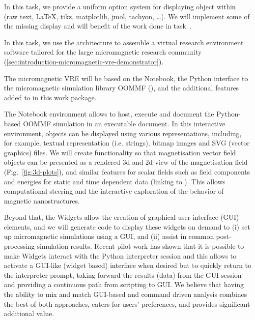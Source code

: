 \begin{workpackage}
\begin{tasklist}
\begin{task}[lead=UB,title=Common option system for various displays
  in Sage,id=Sage-display,PM=12,partners={UB},wphases=0-24]
  In this task, we provide a uniform option system for displaying object within \Sage (raw text, \LaTeX,
  tikz, matplotlib, jmol, tachyon, \ldots). We will implement some of the missing display and will benefit
  of the work done in task~.
\end{task}

\begin{task}[lead=USO,title=Case study: micromagnetic VRE built from
  \TheProject,id=oommf-py-ipython-attributes,PM=6,partners={SR,USH},wphases=9-15]

  In this task, we use the \TheProject architecture to assemble a
  virtual research environment software tailored for the large
  micromagnetic research community
  (\ref{sec:introduction-micromagnetic-vre-demonstrator}).

  The micromagnetic VRE will be based on the \Jupyter Notebook, the
  Python interface to the micromagnetic simulation library OOMMF
  (),
  and the additional features added to \Jupyter in this work
  package.

  The \Jupyter Notebook environment allows to host, execute and
  document the Python-based OOMMF simulation in an executable
  document. In this interactive environment, objects can be displayed
  using various representations, including, for example, textual
  representation (i.e. strings), bitmap images and SVG (vector
  graphics) files. We will create functionality so that magnetisation
  vector field objects can be presented as a rendered 3d and 2d-view
  of the magnetisation field (Fig.~\ref{fig:3d-plots}), and similar
  features for scalar fields such as field components and energies for
  static and time dependent data (linking to
  ). This allows computational steering and the
  interactive exploration of the behavior of magnetic nanostructures.

  Beyond that, the \Jupyter Widgets allow the creation of graphical
  user interface (GUI) elements, and we will generate code to
  display these widgets on demand to (i) set up micromagnetic
  simulations using a GUI, and (ii) assist in common post-processing
  simulation results. Recent pilot work has shown that it is possible
  to make \Jupyter Widgets interact with the Python interpreter
  session and this allows to activate a GUI-like (widget based)
  interface when desired but to quickly return to the interpreter
  prompt, taking forward the results (data) from the GUI session
  \cite{IPython-widget-GUI-demo-youtube-2014} and providing a
  continuous path from scripting to GUI. We believe that having the
  ability to mix and match GUI-based and command driven analysis
  combines the best of both approaches, caters for users' preferences,
  and provides significant additional value.


\end{task}
\end{tasklist}
\end{workpackage}
